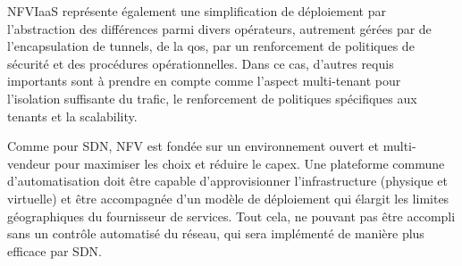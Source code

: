 NFVIaaS représente également une simplification de déploiement par l'abstraction des différences parmi divers opérateurs, autrement gérées par de l'encapsulation de tunnels, de la \gls{qos}, par un renforcement de politiques de sécurité et des procédures opérationnelles. Dans ce cas, d'autres requis importants sont à prendre en compte comme l'aspect multi-tenant pour l'isolation suffisante du trafic, le renforcement de politiques spécifiques aux tenants et la \gls{scalability}.

Comme pour SDN, NFV est fondée sur un environnement ouvert et multi-vendeur pour maximiser les choix et réduire le \gls{capex}. Une plateforme commune d'automatisation doit être capable d'approvisionner l'infrastructure (physique et virtuelle) et être accompagnée d'un modèle de déploiement qui élargit les limites géographiques du fournisseur de services. Tout cela, ne pouvant pas être accompli sans un contrôle automatisé du réseau, qui sera implémenté de manière plus efficace par SDN. \cite{OFSDNNFVand} \cite{nfvUseCases}
